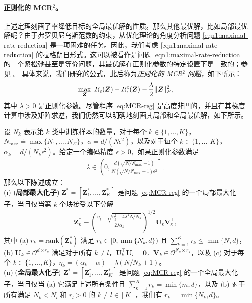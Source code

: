 \documentclass[../../book-main_zh.tex]{subfiles}
\begin{document}
\paragraph{正则化的 MCR$^2$。}
上述定理刻画了率降低目标的全局最优解的性质。那么其他最优解，比如局部最优解呢？由于弗罗贝尼乌斯范数的约束，从优化理论的角度分析问题 \eqref{eqn1:maximal-rate-reduction} 是一项困难的任务。因此，我们考虑 \eqref{eqn1:maximal-rate-reduction} 的拉格朗日形式。这可以被看作是问题 \eqref{eqn1:maximal-rate-reduction} 的一个紧松弛甚至是等价问题，其最优解在正则化参数的特定设置下是一致的；参见 \cite[Proposition 1]{wang2024global}。
具体来说，我们研究的公式，此后称为\textit{正则化的 MCR$^2$ 问题}，如下所示：
\begin{align}\label{eq:MCR-reg}
	\max_{\bm Z}\ R_{\epsilon}(\bm{Z}) - R_{\epsilon}^c(\bm{Z}) - \frac{\lambda}{2}\|\bm Z\|_F^2,
\end{align}
其中 $\lambda > 0$ 是正则化参数。尽管程序 \eqref{eq:MCR-reg} 是高度非凹的，并且在其梯度计算中涉及矩阵求逆，我们仍然可以明确地刻画其局部和全局最优解，如下所示。

\begin{theorem}[\bf 局部和全局最优解]\label{thm:mcr-global-opt}
	设 $N_k$ 表示第 $k$ 类中训练样本的数量，对于每个 $k \in \{1,\dots,K\}$，$N_{\max} \doteq \max\{N_1,\dots,N_K\}$，$\alpha=d/(N\epsilon^2)$，以及对于每个 $k \in \{1,\dots,K\}$，$\alpha_{k} = d/(N_k\epsilon^2)$。给定一个编码精度 $\epsilon > 0$，如果正则化参数满足
	\begin{align}\label{eq:lambda}
		\lambda \in \left(0, \frac{d(\sqrt{N/N_{\max}}-1)}{N(\sqrt{N/N_{\max}}+1)\epsilon^2} \right],
	\end{align}
	那么以下陈述成立： \\
	(i) ({\bf 局部最大化子}) $\bm Z^* = \left[\bm Z_1^*,\dots,\bm Z_K^* \right]$ 是问题 \eqref{eq:MCR-reg} 的一个局部最大化子，当且仅当第 $k$ 个块接受以下分解
	\begin{align}\label{eq:Zk opti}
		\bm Z_k^* = \left(\frac{ \eta_k + \sqrt{\eta_k^2 - 4\lambda^2N/N_k}}{2\lambda \alpha_{k}}\right)^{1/2} \bm U_k \bm V_k^\top,
	\end{align}
	其中 (a) $r_k = \mathrm{rank}(\bm Z_k^*)$ 满足 $r_k \in [0,\min\{N_k,d\})$ 且 $\sum_{k=1}^K r_k \le \min\{N,d\}$，(b) $\bm U_k \in \mathcal{O}^{d \times r_k}$ 满足对于所有 $k \neq l$，$\bm U_k^{\top}\bm U_l = \bm 0$，$\bm V_k \in \mathcal{O}^{N_k \times r_k}$，以及 (c) 对于每个 $k\in \{1,\dots,K\}$，$\eta_k=(\alpha_k-\alpha) - \lambda(N/N_k+1)$。
	\\
	(ii) ({\bf 全局最大化子}) $\bm Z^* = \left[\bm Z_1^*,\dots,\bm Z_K^* \right]$ 是问题 \eqref{eq:MCR-reg} 的一个全局最大化子，当且仅当 (a) 它满足上述所有条件且 $\sum_{k=1}^K r_k = \min\{m,d\}$，以及 (b) 对于所有满足 $N_k < N_l$ 和 $r_l > 0$ 的 $k \neq l \in [K]$，我们有 $r_k = \min\{N_k,d\}$。
\end{theorem}
\end{document}
